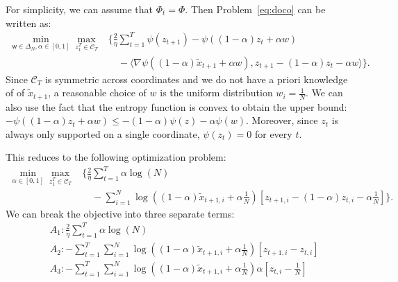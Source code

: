 \documentclass{article}
\newcommand{\sC}{\mathscr C}
\newcommand{\sfw}{{\mathsf w}}
\begin{document}
For simplicity, we can assume that $\Phi_t = \Phi$. Then Problem~\ref{eq:doco} 
can be written as:
\begin{align*}
  \label{eq:docokshift}
  \min_{\sfw \in \Delta_N, \alpha \in [0,1] } \max_{z_1^T \in \sC_T} 
  &\Bigg\{ \frac{2}{\eta} \sum_{t = 1}^T \psi(z_{t+1}) - \psi((1-\alpha) z_t + \alpha w) \\
  &\quad - \langle \nabla \psi((1-\alpha) \tilde{x}_{t+1} + \alpha w), z_{t+1} - (1-\alpha) z_t - \alpha w \rangle \Bigg\}.
\end{align*}
Since $\sC_T$ is symmetric across coordinates and we do not have a priori knowledge of 
of $\tilde{x}_{t+1}$, a reasonable choice of $w$ is the uniform distribution
$w_i = \frac{1}{N}$. 
We can also use the fact that the entropy function is convex to obtain the 
upper bound:
$-\psi((1-\alpha)z_t + \alpha w) \leq -(1-\alpha) \psi(z) - \alpha \psi(w)$. 
Moreover, since $z_{t}$ is always only supported on a single coordinate, $\psi(z_t) = 0$ for every $t$.

This reduces to the following optimization problem: 
\begin{align*}
  \min_{\alpha \in [0,1] } \max_{z_1^T \in \sC_T} 
  &\Bigg\{ \frac{2}{\eta} \sum_{t = 1}^T \alpha \log(N)\\ 
  &\quad - \sum_{i=1}^N \log\left((1-\alpha) \tilde{x}_{t+1, i} + \alpha \frac{1}{N}\right) \left[ z_{t+1,i} - (1-\alpha) z_{t,i} - \alpha \frac{1}{N} \right] \Bigg\}.
\end{align*}
 We can break the objective into three separate terms:
 \begin{align*}
   &A_1: \frac{2}{\eta} \sum_{t = 1}^T \alpha \log(N) \\
   &A_2:  -\sum_{t = 1}^T \sum_{i=1}^N \log\left((1-\alpha) \tilde{x}_{t+1, i} + \alpha \frac{1}{N}\right) \left[ z_{t+1,i} - z_{t,i} \right] \\
   &A_3: - \sum_{t = 1}^T \sum_{i=1}^N \log\left((1-\alpha) \tilde{x}_{t+1, i} + \alpha \frac{1}{N}\right) \alpha \left[ z_{t,i} - \frac{1}{N} \right] 
 \end{align*}
\end{document}

